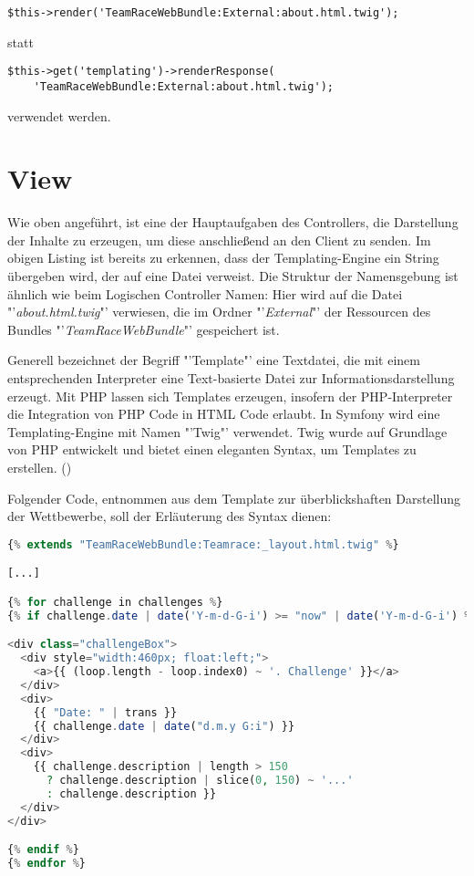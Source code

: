 \documentclass[12pt]{report}
\begin{document}
\begin{lstlisting}
$this->render('TeamRaceWebBundle:External:about.html.twig');
\end{lstlisting}
statt 
\begin{lstlisting}
$this->get('templating')->renderResponse(
	'TeamRaceWebBundle:External:about.html.twig');
\end{lstlisting}
verwendet werden.

\section{View}

Wie oben angeführt, ist eine der Hauptaufgaben des Controllers, die Darstellung der Inhalte zu erzeugen, um diese anschließend an den Client zu senden. Im obigen Listing ist bereits zu erkennen, dass der Templating-Engine ein String übergeben wird, der auf eine Datei verweist. Die Struktur der Namensgebung ist ähnlich wie beim Logischen Controller Namen: Hier wird auf die Datei "'\emph{about.html.twig}"' verwiesen, die im Ordner "'\emph{External}"' der Ressourcen des Bundles "'\emph{TeamRaceWebBundle}"' gespeichert ist.

Generell bezeichnet der Begriff "'Template"' eine Textdatei, die mit einem entsprechenden Interpreter eine Text-basierte Datei zur Informationsdarstellung erzeugt. Mit PHP lassen sich Templates erzeugen, insofern der PHP-Interpreter die Integration von PHP Code in HTML Code erlaubt. In Symfony wird eine Templating-Engine mit Namen "'Twig"' verwendet. Twig wurde auf Grundlage von PHP entwickelt und bietet einen eleganten Syntax, um Templates zu erstellen. (\cite{sf2:Templates}) 

Folgender Code, entnommen aus dem Template zur überblickshaften Darstellung der Wettbewerbe, soll der Erläuterung des Syntax dienen:
\begin{lstlisting}[language=PHP, caption=Auszug aus\\ src/TeamRace/WebBundle/Resources/views/Teamrace/challenges.html.twig, label=lst:challenges]
{% extends "TeamRaceWebBundle:Teamrace:_layout.html.twig" %}

[...]

{% for challenge in challenges %}
{% if challenge.date | date('Y-m-d-G-i') >= "now" | date('Y-m-d-G-i') %}

<div class="challengeBox">
  <div style="width:460px; float:left;">
    <a>{{ (loop.length - loop.index0) ~ '. Challenge' }}</a>
  </div>
  <div>
    {{ "Date: " | trans }}
    {{ challenge.date | date("d.m.y G:i") }}
  </div>
  <div>
    {{ challenge.description | length > 150 
      ? challenge.description | slice(0, 150) ~ '...' 
      : challenge.description }}
  </div>
</div>

{% endif %}
{% endfor %}

\end{lstlisting}
\end{document}
